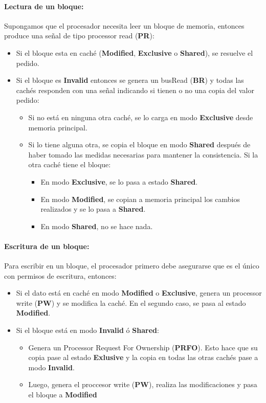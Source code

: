 \paragraph{Lectura de un bloque:}
Supongamos que el procesador necesita leer un bloque de memoria, entonces produce una señal de tipo processor read (\textbf{PR}):
\begin{itemize}
	\item Si el bloque esta en caché (\textbf{Modified}, \textbf{Exclusive} o \textbf{Shared}), se resuelve el pedido.
	\item Si el bloque es \textbf{Invalid} entonces se genera un busRead (\textbf{BR}) y todas las cachés responden con una señal indicando si tienen o no una copia del valor pedido:
	\begin{itemize}
		\item Si no está en ninguna otra caché, se lo carga en modo \textbf{Exclusive} desde memoria principal.
		\item Si lo tiene alguna otra, se copia el bloque en modo \textbf{Shared} después de haber tomado las medidas necesarias para mantener la consistencia. Si la otra caché tiene el bloque:
		\begin{itemize}
			\item En modo \textbf{Exclusive}, se lo pasa a estado \textbf{Shared}.
			\item En modo \textbf{Modified}, se copian a memoria principal los cambios realizados y se lo pasa a \textbf{Shared}.
			\item En modo \textbf{Shared}, no se hace nada.
		\end{itemize}
	\end{itemize}
\end{itemize}

\paragraph{Escritura de un bloque:} Para escribir en un bloque, el procesador primero debe asegurarse que es el único con permisos de escritura, entonces:

\begin{itemize}
	\item Si el dato está en caché en modo \textbf{Modified} o \textbf{Exclusive}, genera un processor write (\textbf{PW}) y se modifica la caché. En el segundo caso, se pasa al estado \textbf{Modified}.
	\item Si el bloque está en modo \textbf{Invalid} ó \textbf{Shared}:
	\begin{itemize}
		\item Genera un Processor Request For Ownership (\textbf{PRFO}). Esto hace que su copia pase al estado \textbf{Exlusive} y la copia en todas las otras cachés pase a modo \textbf{Invalid}.
		\item Luego, genera el proccesor write (\textbf{PW}), realiza las modificaciones y pasa el bloque a \textbf{Modified}
	\end{itemize}
\end{itemize}

